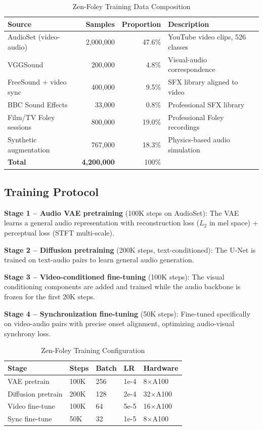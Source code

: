 \documentclass[11pt,a4paper]{article}
\begin{document}
\begin{table}[H]
\centering
\begin{tabular}{lrrl}
\toprule
\textbf{Source} & \textbf{Samples} & \textbf{Proportion} & \textbf{Description} \\
\midrule
AudioSet (video-audio) & 2,000,000 & 47.6\% & YouTube video clips, 526 classes \\
VGGSound & 200,000 & 4.8\% & Visual-audio correspondence \\
FreeSound + video sync & 400,000 & 9.5\% & SFX library aligned to video \\
BBC Sound Effects & 33,000 & 0.8\% & Professional SFX library \\
Film/TV Foley sessions & 800,000 & 19.0\% & Professional Foley recordings \\
Synthetic augmentation & 767,000 & 18.3\% & Physics-based audio simulation \\
\midrule
\textbf{Total} & \textbf{4,200,000} & 100\% & \\
\bottomrule
\end{tabular}
\caption{Zen-Foley Training Data Composition}
\end{table}

\subsection{Training Protocol}

\textbf{Stage 1 -- Audio VAE pretraining} (100K steps on AudioSet): The VAE learns a general
audio representation with reconstruction loss ($L_2$ in mel space) + perceptual loss
(STFT multi-scale).

\textbf{Stage 2 -- Diffusion pretraining} (200K steps, text-conditioned): The U-Net is
trained on text-audio pairs to learn general audio generation.

\textbf{Stage 3 -- Video-conditioned fine-tuning} (100K steps): The visual conditioning
components are added and trained while the audio backbone is frozen for the first 20K steps.

\textbf{Stage 4 -- Synchronization fine-tuning} (50K steps): Fine-tuned specifically on
video-audio pairs with precise onset alignment, optimizing audio-visual synchrony loss.

\begin{table}[H]
\centering
\begin{tabular}{lllll}
\toprule
\textbf{Stage} & \textbf{Steps} & \textbf{Batch} & \textbf{LR} & \textbf{Hardware} \\
\midrule
VAE pretrain & 100K & 256 & 1e-4 & 8$\times$A100 \\
Diffusion pretrain & 200K & 128 & 2e-4 & 32$\times$A100 \\
Video fine-tune & 100K & 64 & 5e-5 & 16$\times$A100 \\
Sync fine-tune & 50K & 32 & 1e-5 & 8$\times$A100 \\
\bottomrule
\end{tabular}
\caption{Zen-Foley Training Configuration}
\end{table}
\end{document}
